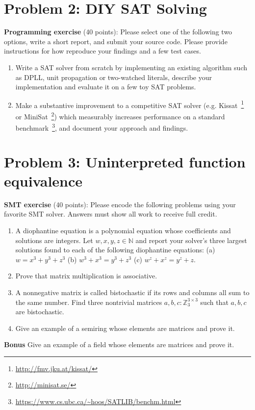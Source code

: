 \documentclass[11pt]{article}
\begin{document}
    \section{Problem 2: DIY SAT Solving}

    \noindent \textbf{Programming exercise} (40 points): Please select one of the following two options, write a short report, and submit your source code. Please provide instructions for how reproduce your findings and a few test cases.

    \begin{enumerate}
        \item Write a SAT solver from scratch by implementing an existing algorithm such as DPLL, unit propagation or two-watched literals, describe your implementation and evaluate it on a few toy SAT problems.
        \item Make a substantive improvement to a competitive SAT solver (e.g. Kissat~\footnote{\url{http://fmv.jku.at/kissat/}} or MiniSat~\footnote{\url{http://minisat.se/}}) which measurably increases performance on a standard benchmark~\footnote{\url{https://www.cs.ubc.ca/~hoos/SATLIB/benchm.html}}, and document your approach and findings.
    \end{enumerate}

    \section {Problem 3: Uninterpreted function equivalence}

    \noindent \textbf{SMT exercise} (40 points): Please encode the following problems using your favorite SMT solver. Answers must show all work to receive full credit.\\

    \begin{enumerate}
        \item A diophantine equation is a polynomial equation whose coefficients and solutions are integers. Let $w, x, y, z \in \mathbb{N}$ and report your solver's three largest solutions found to each of the following diophantine equations: (a) $w = x^3+y^3+z^3$ (b) $w^3 + x^3 = y^3+z^3$ (c) $w^z + x^z = y^z + z$.
        \item Prove that matrix multiplication is associative.
        \item A nonnegative matrix is called bistochastic if its rows and columns all sum to the same number. Find three nontrivial matrices $a, b, c: \mathbb{Z}_3^{3\times 3}$ such that $a, b, c$ are bistochastic.
        \item Give an example of a semiring whose elements are matrices and prove it.
    \end{enumerate}

    \textbf{Bonus} Give an example of a field whose elements are matrices and prove it.
\end{document}
